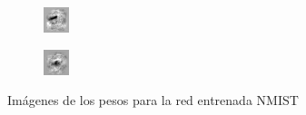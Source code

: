 \documentclass[journal]{IEEEtran}
\begin{document}
\begin{figure}[h]
\begin{subfigure}[b]{0.2\textwidth}
    \end{subfigure}
            \begin{subfigure}[b]{0.2\textwidth}
        \includegraphics[width=\textwidth]{19.png}
    \end{subfigure}
            \begin{subfigure}[b]{0.2\textwidth}
        \includegraphics[width=\textwidth]{21.png}
    \end{subfigure}
    
    \caption{Imágenes de los pesos para la red entrenada NMIST}\label{fig:animals}
\end{figure}
\end{document}
